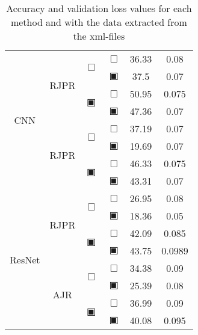 \begin{table}[H]
\begin{tabular}{|c|c|c|c|c|c|}
		\hline\hline
		\multirow{8}{*}{CNN}& \multirow{4}{*}{ RJPR } & \multirow{2}{*}{$\Box$} & $\Box$ & 36.33 & 0.08\\\cline{4-6}
				    &                    &                         & $\blackinwhitesquare$ & 37.5 & 0.07\\\cline{3-6}
				    &                    & \multirow{2}{*}{$\blackinwhitesquare$} & $\Box$ & 50.95 & 0.075\\\cline{4-6}
				    &                    &                         & $\blackinwhitesquare$ & 47.36 & 0.07\\\cline{2-6}
		                    & \multirow{4}{*}{ RJPR } & \multirow{2}{*}{$\Box$} & $\Box$ & 37.19 & 0.07\\\cline{4-6}
				    &                    &                         & $\blackinwhitesquare$ & 19.69 & 0.07\\\cline{3-6}
				    &                    & \multirow{2}{*}{$\blackinwhitesquare$} & $\Box$ & 46.33 & 0.075\\\cline{4-6}
				    &                    &                         & $\blackinwhitesquare$ & 43.31 & 0.07\\\cline{2-6}
		\hline\hline
		\multirow{8}{*}{ResNet}& \multirow{4}{*}{ RJPR } & \multirow{2}{*}{$\Box$} & $\Box$ & 26.95 & 0.08\\\cline{4-6}
				    &                    &                         & $\blackinwhitesquare$ & 18.36 & 0.05\\\cline{3-6}
				    &                    & \multirow{2}{*}{$\blackinwhitesquare$} & $\Box$ & 42.09 & 0.085\\\cline{4-6}
				    &                    &                         & $\blackinwhitesquare$ & 43.75 & 0.0989\\\cline{2-6}
				    & \multirow{4}{*}{ AJR } & \multirow{2}{*}{$\Box$} & $\Box$ & 34.38 & 0.09\\\cline{4-6}
				    &                     &                         & $\blackinwhitesquare$ & 25.39 & 0.08\\\cline{3-6}
				    &                     & \multirow{2}{*}{$\blackinwhitesquare$} & $\Box$ & 36.99 & 0.09\\\cline{4-6}
				    &                     &                         & $\blackinwhitesquare$ & 40.08 & 0.095\\\cline{2-6}
		\hline\hline
	\end{tabular}
	\caption{Accuracy and validation loss values for each method and with the data extracted from the xml-files}
	\label{tab:results-experiments-raw}
\end{table}
